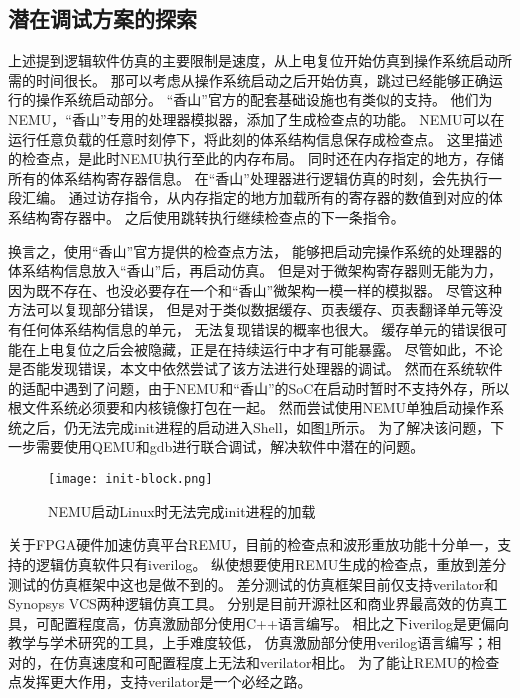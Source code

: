 \subsection{潜在调试方案的探索}

上述提到逻辑软件仿真的主要限制是速度，从上电复位开始仿真到操作系统启动所需的时间很长。
那可以考虑从操作系统启动之后开始仿真，跳过已经能够正确运行的操作系统启动部分。
“香山”官方的配套基础设施也有类似的支持。
他们为NEMU，“香山”专用的处理器模拟器，添加了生成检查点的功能。
NEMU可以在运行任意负载的任意时刻停下，将此刻的体系结构信息保存成检查点。
这里描述的检查点，是此时NEMU执行至此的内存布局。
同时还在内存指定的地方，存储所有的体系结构寄存器信息。
在“香山”处理器进行逻辑仿真的时刻，会先执行一段汇编。
通过访存指令，从内存指定的地方加载所有的寄存器的数值到对应的体系结构寄存器中。
之后使用跳转执行继续检查点的下一条指令。

换言之，使用“香山”官方提供的检查点方法，
能够把启动完操作系统的处理器的体系结构信息放入“香山”后，再启动仿真。
但是对于微架构寄存器则无能为力，
因为既不存在、也没必要存在一个和“香山”微架构一模一样的模拟器。
尽管这种方法可以复现部分错误，
但是对于类似数据缓存、页表缓存、页表翻译单元等没有任何体系结构信息的单元，
无法复现错误的概率也很大。
缓存单元的错误很可能在上电复位之后会被隐藏，正是在持续运行中才有可能暴露。
尽管如此，不论是否能发现错误，本文中依然尝试了该方法进行处理器的调试。
然而在系统软件的适配中遇到了问题，由于NEMU和“香山”的SoC在启动时暂时不支持外存，所以根文件系统必须要和内核镜像打包在一起。
然而尝试使用NEMU单独启动操作系统之后，仍无法完成init进程的启动进入Shell，如图\ref{fig:init-block}所示。
为了解决该问题，下一步需要使用QEMU和gdb进行联合调试，解决软件中潜在的问题。

\begin{figure}[htbp]
    \centering
    \texttt{[image: init-block.png]}
    \caption{NEMU启动Linux时无法完成init进程的加载}
    \label{fig:init-block}
\end{figure}

关于FPGA硬件加速仿真平台REMU，目前的检查点和波形重放功能十分单一，支持的逻辑仿真软件只有iverilog。
纵使想要使用REMU生成的检查点，重放到差分测试的仿真框架中这也是做不到的。
差分测试的仿真框架目前仅支持verilator和Synopsys VCS两种逻辑仿真工具。
分别是目前开源社区和商业界最高效的仿真工具，可配置程度高，仿真激励部分使用C++语言编写。
相比之下iverilog是更偏向教学与学术研究的工具，上手难度较低，
仿真激励部分使用verilog语言编写；相对的，在仿真速度和可配置程度上无法和verilator相比。
为了能让REMU的检查点发挥更大作用，支持verilator是一个必经之路。

